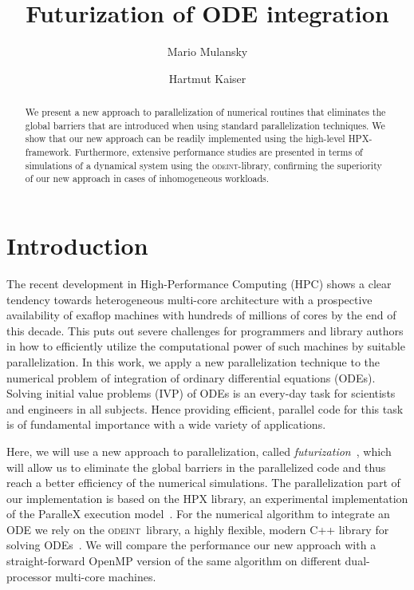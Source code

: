 \documentclass[10pt]{elsarticle}
\title{Futurization of ODE integration}
\author[cct]{Mario Mulansky}
\author[cct]{Hartmut Kaiser}
\newcommand{\odeint}{\textsc{odeint}}
\begin{document}
\begin{abstract}
We present a new approach to parallelization of numerical routines that eliminates the global barriers that are introduced when using standard parallelization techniques.
We show that our new approach can be readily implemented using the high-level HPX-framework.
Furthermore, extensive performance studies are presented in terms of simulations of a dynamical system using the \odeint-library, confirming the superiority of our new approach in cases of inhomogeneous workloads.
\end{abstract}

\maketitle

\section{Introduction}

The recent development in High-Performance Computing (HPC) shows a clear tendency towards heterogeneous multi-core architecture with a prospective availability of exaflop machines with hundreds of millions of cores by the end of this decade.
This puts out severe challenges for programmers and library authors in how to efficiently utilize the computational power of such machines by suitable parallelization.
In this work, we apply a new parallelization technique to the numerical problem of integration of ordinary differential equations (ODEs).
Solving initial value problems (IVP) of ODEs is an every-day task for scientists and engineers in all subjects.
Hence providing efficient, parallel code for this task is of fundamental importance  with a wide variety of applications.

Here, we will use a new approach to parallelization, called \emph{futurization}~\cite{Heller_Kaiser_Mulansky_tbp}, which will allow us to eliminate the global barriers in the parallelized code and thus reach a better efficiency of the numerical simulations.
The parallelization part of our implementation is based on the HPX library, an experimental implementation of the ParalleX execution model~\cite{Kaiser_Brodowicz_Sterling_09}.
For the numerical algorithm to integrate an ODE we rely on the \odeint\ library, a highly flexible, modern C++ library for solving ODEs~\cite{Ahnert_Mulansky_11}.
We will compare the performance our new approach with a straight-forward OpenMP version of the same algorithm on different dual-processor multi-core machines.
\end{document}
